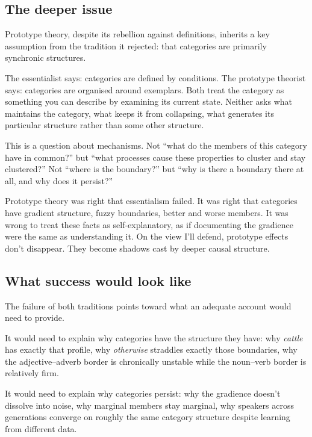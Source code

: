 \subsection*{The deeper issue}

Prototype theory, despite its rebellion against definitions, inherits a key assumption from the tradition it rejected: that categories are primarily synchronic structures.

The essentialist says: categories are defined by conditions. The prototype theorist says: categories are organised around exemplars. Both treat the category as something you can describe by examining its current state. Neither asks what maintains the category, what keeps it from collapsing, what generates its particular structure rather than some other structure.

This is a question about mechanisms. Not \enquote{what do the members of this category have in common?} but \enquote{what processes cause these properties to cluster and stay clustered?} Not \enquote{where is the boundary?} but \enquote{why is there a boundary there at all, and why does it persist?}

Prototype theory was right that essentialism failed. It was right that categories have gradient structure, fuzzy boundaries, better and worse members. It was wrong to treat these facts as self-explanatory, as if documenting the gradience were the same as understanding it. On the view I'll defend, prototype effects don't disappear. They become shadows cast by deeper causal structure.

\subsection*{What success would look like}

The failure of both traditions points toward what an adequate account would need to provide.

It would need to explain why categories have the structure they have: why \textit{cattle} has exactly that profile, why \textit{otherwise} straddles exactly those boundaries, why the adjective–adverb border is chronically unstable while the noun–verb border is relatively firm.

It would need to explain why categories persist: why the gradience doesn't dissolve into noise, why marginal members stay marginal, why speakers across generations converge on roughly the same category structure despite learning from different data.

